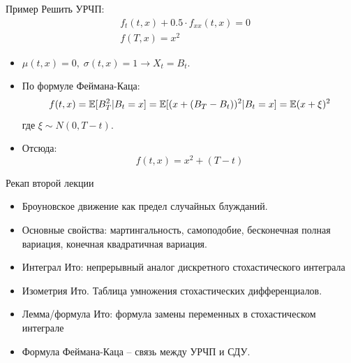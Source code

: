 \documentclass{beamer}
\begin{document}
\begin{frame}{Пример}
    Решить УРЧП:
    \begin{align*}
        &f_t(t, x) + 0.5 \cdot f_{xx}(t, x)  = 0 \\
        &f(T, x) = x^2
    \end{align*}

    \pause
    \begin{itemize}
        \item $\mu(t, x) = 0, \; \sigma(t, x) = 1 \to X_t = B_t$. 

        \item По формуле Феймана-Каца:
        $$
            f(t, x) = \mathbb{E}[B_T^2 | B_t = x] = \mathbb{E}[ (x + (B_T-B_t))^2 | B_t = x ] = \mathbb{E}(x+\xi)^2
        $$где $\xi \sim N(0, T-t)$.

        \item Отсюда:
        $$
            f(t, x) = x^2 + (T-t)
        $$
    \end{itemize}
\end{frame}

\begin{frame}{Рекап второй лекции}
    \begin{itemize}
        \item Броуновское движение как предел случайных блужданий. 
        \item Основные свойства: мартингальность, самоподобие, бесконечная полная вариация, конечная квадратичная вариация.
        \item Интеграл Ито: непрерывный аналог дискретного стохастического интеграла
        \item Изометрия Ито. Таблица умножения стохастических дифференциалов.
        \item Лемма/формула Ито: формула замены переменных в стохастическом интеграле
        \item Формула Феймана-Каца -- связь между УРЧП и СДУ.
    \end{itemize}
\end{frame}
\end{document}
